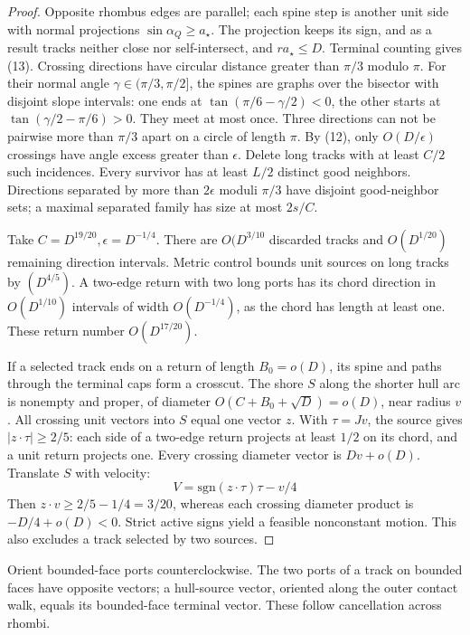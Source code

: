\documentclass[10pt,reqno]{amsart}
\begin{document}
\begin{proof}
    Opposite rhombus edges are parallel; each spine step is another unit side with normal projections $\sin \alpha_Q \ge a_\star$. The projection keeps its sign, and as a result tracks neither close nor self-intersect, and $r a_\star \le D$. Terminal counting gives (13). Crossing directions have circular distance greater than $\pi / 3$ modulo $\pi$. For their normal angle $\gamma \in (\pi / 3, \pi / 2]$, the spines are graphs over the bisector with disjoint slope intervals: one ends at $\tan(\pi/6  - \gamma/2) < 0$, the other starts at $\tan(\gamma/2 - \pi/6) > 0$. They meet at most once. Three directions can not be pairwise more than $\pi / 3$ apart on a circle of length $\pi$. By (12), only $O(D / \epsilon)$ crossings have angle excess greater than $\epsilon$. Delete long tracks with at least $C / 2$ such incidences. Every survivor has at least $L / 2$ distinct good neighbors. Directions separated by more than $2 \epsilon$ moduli $\pi / 3$ have disjoint good-neighbor sets; a maximal separated family has size at most $2s / C$.

    Take $C = D^{19/20}, \epsilon = D^{-1/4}$. There are $O(D^{3/10}$ discarded tracks and $O(D^{1/20})$ remaining direction intervals. Metric control bounds unit sources on long tracks by $(D^{4/5})$. A two-edge return with two long ports has its chord direction in $O(D^{1/10})$ intervals of width $O(D^{-1/4})$, as the chord has length at least one. These return number $O(D^{17/20})$.

    If a selected track ends on a return of length $B_0 = o(D)$, its spine and paths through the terminal caps form a crosscut. The shore $S$ along the shorter hull arc is nonempty and proper, of diameter $O(C + B_0 + \sqrt{D}) = o(D)$, near radius $v$. All crossing unit vectors into $S$ equal one vector $z$. With $\tau = Jv$, the source gives $|z \cdot \tau| \ge 2 / 5$: each side of a two-edge return projects at least $1/2$ on its chord, and a unit return projects one. Every crossing diameter vector is $Dv + o(D)$. Translate $S$ with velocity:
    \begin{equation}
        V = \text{sgn}(z \cdot \tau) \tau - v / 4
    \end{equation}
    Then $z \cdot v \ge 2/5 - 1/4 = 3/20$, whereas each crossing diameter product is $-D / 4 + o(D) < 0$. Strict active signs yield a feasible nonconstant motion. This also excludes a track selected by two sources.
\end{proof}

Orient bounded-face ports counterclockwise. The two ports of a track on bounded faces have opposite vectors; a hull-source vector, oriented along the outer contact walk, equals its bounded-face terminal vector. These follow cancellation across rhombi.
\end{document}
